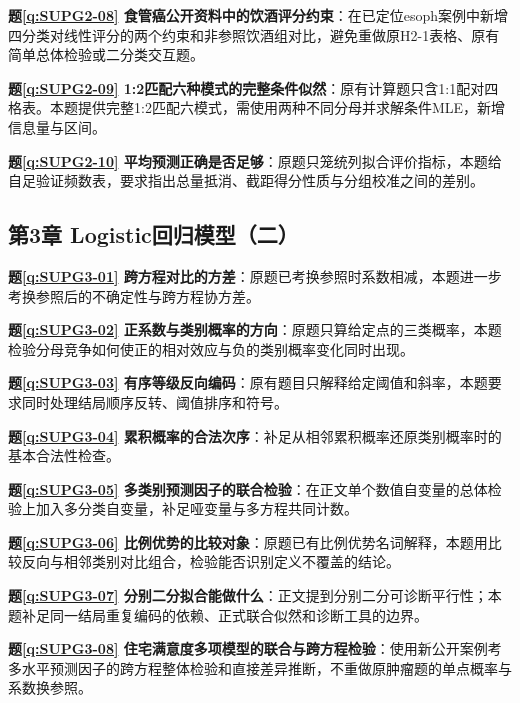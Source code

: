 \noindent\textbf{题\ref*{q:SUPG2-08} 食管癌公开资料中的饮酒评分约束}：在已定位esoph案例中新增四分类对线性评分的两个约束和非参照饮酒组对比，避免重做原H2-1表格、原有简单总体检验或二分类交互题。\par

\noindent\textbf{题\ref*{q:SUPG2-09} 1:2匹配六种模式的完整条件似然}：原有计算题只含1:1配对四格表。本题提供完整1:2匹配六模式，需使用两种不同分母并求解条件MLE，新增信息量与区间。\par

\noindent\textbf{题\ref*{q:SUPG2-10} 平均预测正确是否足够}：原题只笼统列拟合评价指标，本题给自足验证频数表，要求指出总量抵消、截距得分性质与分组校准之间的差别。\par

\subsection*{第3章 Logistic回归模型（二）}

\noindent\textbf{题\ref*{q:SUPG3-01} 跨方程对比的方差}：原题已考换参照时系数相减，本题进一步考换参照后的不确定性与跨方程协方差。\par

\noindent\textbf{题\ref*{q:SUPG3-02} 正系数与类别概率的方向}：原题只算给定点的三类概率，本题检验分母竞争如何使正的相对效应与负的类别概率变化同时出现。\par

\noindent\textbf{题\ref*{q:SUPG3-03} 有序等级反向编码}：原有题目只解释给定阈值和斜率，本题要求同时处理结局顺序反转、阈值排序和符号。\par

\noindent\textbf{题\ref*{q:SUPG3-04} 累积概率的合法次序}：补足从相邻累积概率还原类别概率时的基本合法性检查。\par

\noindent\textbf{题\ref*{q:SUPG3-05} 多类别预测因子的联合检验}：在正文单个数值自变量的总体检验上加入多分类自变量，补足哑变量与多方程共同计数。\par

\noindent\textbf{题\ref*{q:SUPG3-06} 比例优势的比较对象}：原题已有比例优势名词解释，本题用比较反向与相邻类别对比组合，检验能否识别定义不覆盖的结论。\par

\noindent\textbf{题\ref*{q:SUPG3-07} 分别二分拟合能做什么}：正文提到分别二分可诊断平行性；本题补足同一结局重复编码的依赖、正式联合似然和诊断工具的边界。\par

\noindent\textbf{题\ref*{q:SUPG3-08} 住宅满意度多项模型的联合与跨方程检验}：使用新公开案例考多水平预测因子的跨方程整体检验和直接差异推断，不重做原肿瘤题的单点概率与系数换参照。\par


